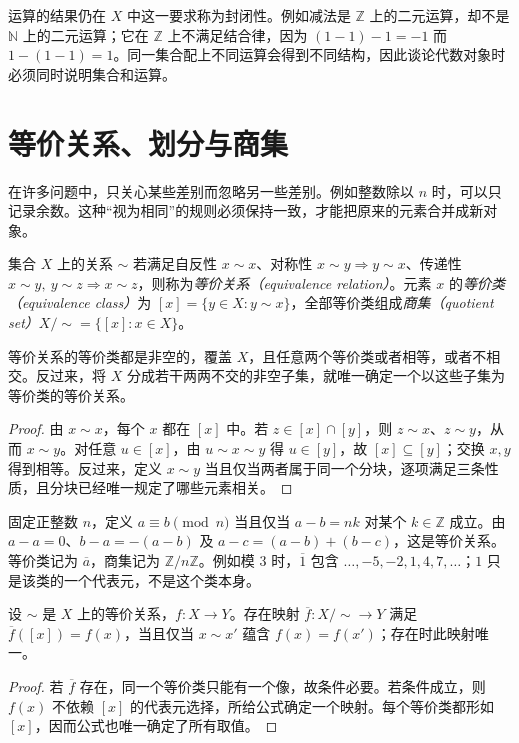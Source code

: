 运算的结果仍在 $X$ 中这一要求称为封闭性。例如减法是 $\mathbb Z$ 上的二元运算，却不是 $\mathbb N$ 上的二元运算；它在 $\mathbb Z$ 上不满足结合律，因为 $(1-1)-1=-1$ 而 $1-(1-1)=1$。同一集合配上不同运算会得到不同结构，因此谈论代数对象时必须同时说明集合和运算。

\section{等价关系、划分与商集}\label{sec:equivalence-quotients}

在许多问题中，只关心某些差别而忽略另一些差别。例如整数除以 $n$ 时，可以只记录余数。这种“视为相同”的规则必须保持一致，才能把原来的元素合并成新对象。

\begin{definition}[等价关系与商集]
集合 $X$ 上的关系 $\sim$ 若满足自反性 $x\sim x$、对称性 $x\sim y\Rightarrow y\sim x$、传递性 $x\sim y,\ y\sim z\Rightarrow x\sim z$，则称为\emph{等价关系（equivalence relation）}。元素 $x$ 的\emph{等价类（equivalence class）}为 $[x]=\{y\in X:y\sim x\}$，全部等价类组成\emph{商集（quotient set）}$X/{\sim}=\{[x]:x\in X\}$。
\end{definition}

\begin{proposition}[等价关系与划分]\label{prop:equivalence-partition}
等价关系的等价类都是非空的，覆盖 $X$，且任意两个等价类或者相等，或者不相交。反过来，将 $X$ 分成若干两两不交的非空子集，就唯一确定一个以这些子集为等价类的等价关系。
\end{proposition}
\begin{proof}
由 $x\sim x$，每个 $x$ 都在 $[x]$ 中。若 $z\in[x]\cap[y]$，则 $z\sim x$、$z\sim y$，从而 $x\sim y$。对任意 $u\in[x]$，由 $u\sim x\sim y$ 得 $u\in[y]$，故 $[x]\subseteq[y]$；交换 $x,y$ 得到相等。反过来，定义 $x\sim y$ 当且仅当两者属于同一个分块，逐项满足三条性质，且分块已经唯一规定了哪些元素相关。
\end{proof}

\begin{example}[整数同余]\label{ex:integer-congruence}
固定正整数 $n$，定义 $a\equiv b\pmod n$ 当且仅当 $a-b=nk$ 对某个 $k\in\mathbb Z$ 成立。由 $a-a=0$、$b-a=-(a-b)$ 及 $a-c=(a-b)+(b-c)$，这是等价关系。等价类记为 $\overline a$，商集记为 $\mathbb Z/n\mathbb Z$。例如模 $3$ 时，$\overline1$ 包含 $\ldots,-5,-2,1,4,7,\ldots$；$1$ 只是该类的一个代表元，不是这个类本身。
\end{example}

\begin{proposition}[通过商集定义映射]\label{prop:quotient-set-map}
设 $\sim$ 是 $X$ 上的等价关系，$f:X\to Y$。存在映射 $\overline f:X/{\sim}\to Y$ 满足 $\overline f([x])=f(x)$，当且仅当 $x\sim x'$ 蕴含 $f(x)=f(x')$；存在时此映射唯一。
\end{proposition}
\begin{proof}
若 $\overline f$ 存在，同一个等价类只能有一个像，故条件必要。若条件成立，则 $f(x)$ 不依赖 $[x]$ 的代表元选择，所给公式确定一个映射。每个等价类都形如 $[x]$，因而公式也唯一确定了所有取值。
\end{proof}

